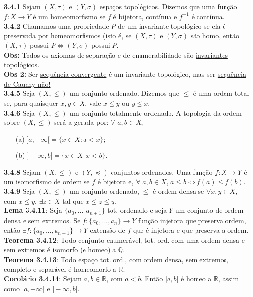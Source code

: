 \documentclass{article}
\begin{document}
\begin{landscape}
\begin{multicols}{3}
\textbf{3.4.1} Sejam \((X, \tau)\) e \((Y, \sigma)\) espaços topológicos. Dizemos que uma função \( f : X \rightarrow Y \) é um homeomorfismo se $f$ é bijetora, contínua e $f^{-1}$ é contínua.\\
\textbf{3.4.2} Chamamos uma propriedade \( P \) de um invariante topológico se ela é preservada por homeomorfismos (isto é, se $(X, \tau)$ e $(Y, \sigma)$ são homo, então $(X, \tau)$ possui $P \iff (Y, \sigma)$ possui $P$.\\
\textbf{Obs:} Todos os axiomas de separação e de enumerabilidade são \underline{invariantes topológicos}.\\
\textbf{Obs 2:} Ser \underline{sequência convergente} é um invariante topológico, mas ser \underline{sequência de Cauchy não!}\\
\textbf{3.4.5} Seja \((X, \leq)\) um conjunto ordenado. Dizemos que \(\leq\) é uma ordem total se, para quaisquer \( x, y \in X \), vale \( x \leq y \) ou \( y \leq x \).\\
\textbf{3.4.6} Seja \((X, \leq)\) um conjunto totalmente ordenado. A topologia da ordem sobre \((X, \leq)\) será a gerada por: $\forall$ \( a, b \in X \),
\begin{enumerate}
    \item[(a)] \( ]a, +\infty[ = \{ x \in X : a < x \} \);
    \item[(b)] \( ]-\infty, b[ = \{ x \in X : x < b \} \).
\end{enumerate}
\textbf{3.4.8} Sejam \((X, \leq)\) e \((Y, \preceq)\) conjuntos ordenados. Uma função \( f : X \rightarrow Y \) é um isomorfismo de ordem se $f$ é bijetora e, $\forall$ \( a, b \in X \), \( a \leq b \Leftrightarrow f(a) \leq f(b) \).\\
\textbf{3.4.9} Seja \((X, \leq)\) um conjunto ordenado, $\leq$ é ordem densa se $\forall x,y \in X$, com \( x \leq y \), $\exists$\( z \in X \) tal que \( x \leq z \leq y \).\\
\textbf{Lema 3.4.11}: Seja $\{a_0,...,a_{n+1}\}$ tot. ordenado e seja $Y$ um conjunto de ordem densa e sem extremos. Se $f:\{a_0,...,a_n\} \rightarrow Y$ função injetora que preserva ordem, então $\exists f:\{a_0,...,a_{n+1}\} \rightarrow Y$ extensão de $f$ que é injetora e que preserva a ordem.\\
\textbf{Teorema 3.4.12}: Todo conjunto enumerável, tot. ord. com uma ordem densa e sem extremos é isomorfo (e homeo) a $\mathbb{Q}$.\\
\textbf{Teorema 3.4.13}: Todo espaço tot. ord., com ordem densa, sem extremos, completo e separável é homeomorfo a $\mathbb{R}$.\\
\textbf{Corolário 3.4.14}: Sejam $a,b \in \mathbb{R}$, com $a < b$. Então $]a,b[$ é homeo a $\mathbb{R}$, assim como $]a,+\infty[$ e $]-\infty, b[$.
\end{multicols}
\begin{center}
    

\end{center}
\end{landscape}
\end{document}
